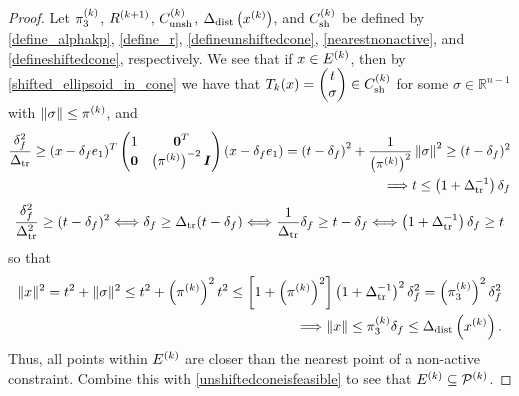 \documentclass{article}
\begin{document}
\begin{proof}



Let $\pi_3^{(k)}$, ${R^{(k+1)}}$, ${C^{(k)}_{\textrm{unsh}}}$, $\Delta_{\textrm{dist}}\left(x^{(k)}\right)$, and ${C^{(k)}_{\textrm{sh}}}$ be defined by
\cref{define_alphakp}, \cref{define_r}, \cref{defineunshiftedcone}, \cref{nearestnonactive}, and \cref{defineshiftedcone},
respectively.
We see that if $x \in {E^{(k)}}$,
then by \cref{shifted_ellipsoid_in_cone} we have that $T_k(x) = \begin{pmatrix}t\\ \sigma\end{pmatrix} \in {C^{(k)}_{\textrm{sh}}}$ for some $\sigma \in \mathbb R^{n-1}$
with $\left\|\sigma\right\| \le \pi^{(k)}$, and
\begin{align*}
\frac {\delta_{f}^2}{\Delta_{\textrm{tr}}} \ge
(x - \delta_{f} e_1)^T\begin{pmatrix}
1 & \boldsymbol0^T \\
\boldsymbol 0 & \left(\pi^{(k)}\right)^{-2} \boldsymbol I \\
\end{pmatrix}(x - \delta_{f} e_1)
 = \left(t - \delta_{f}\right)^2 + \frac {1} {\left(\pi^{(k)}\right)^2}\left\|\sigma\right\|^2
\ge (t - \delta_{f})^2  \\
\Longrightarrow t \le \left(1 + \Delta_{\textrm{tr}}^{-1}\right)\delta_{f}
\end{align*}
\color{magenta}
\begin{align*}
\frac {\delta_{f}^2} {\Delta_{\textrm{tr}}^2} \ge (t - \delta_{f})^2
\Longleftrightarrow \delta_{f} \ge \Delta_{\textrm{tr}} (t - \delta_{f})
\Longleftrightarrow \frac 1 {\Delta_{\textrm{tr}}} \delta_{f} \ge  t - \delta_{f}
\Longleftrightarrow \left(1 + \Delta_{\textrm{tr}}^{-1}\right) \delta_{f} \ge  t
\end{align*}
\color{black}
so that 
\begin{align*}
\|x\|^2 = t^2 + \|\sigma\|^2 \le t^2 + \left(\pi^{(k)}\right)^2 t^2
\le \left[1 + \left(\pi^{(k)}\right)^2 \right] \left(1 + \Delta_{\textrm{tr}}^{-1}\right)^2\delta_{f}^2
= \left(\pi_3^{(k)}\right)^2 \delta_{f}^2 \\
\Longrightarrow \|x\| \le \pi_3^{(k)} \delta_{f} \le \Delta_{\textrm{dist}}\left(x^{(k)}\right).
\end{align*}
Thus, all points within ${E^{(k)}}$ are closer than the nearest point of a non-active constraint.
Combine this with \cref{unshiftedconeisfeasible} to see that ${E^{(k)}} \subseteq {{\mathcal{P}}^{(k)}}$.
\end{proof}
\end{document}
